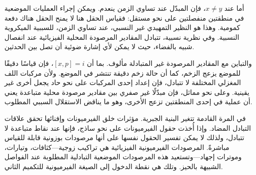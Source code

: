 \begin{classroomqa}
\end{classroomqa}

أما عند \(x\neq y\)، فإن المبدّل عند تساوي الزمن ينعدم. ويمكن إجراء العمليات الموضعية في منطقتين منفصلتين على نحو مستقل: فقياس الحقل هنا لا يمنح الحقل هناك دفعة كمومية. وهذا هو النظير التمهيدي غير النسبي، عند تساوي الزمن، للسببية الميكروية النسبية. وفي نظرية نسبية، تتبادل المقادير المرصودة المحلية الفيزيائية عند انفصال شبيه بالفضاء، حيث لا يمكن لأي إشارة ضوئية أن تصل بين الحدثين.

والتباين مع المقادير المرصودة غير المتبادلة مألوف. بما أن \([x,p]=i\)، فإن قياسًا دقيقًا للموضع يزعج الزخم، كما أن حالة زخم دقيقة تنتشر في الموضع. ولأن مركبات اللف المغزلي المختلفة لا تتبادل، فإن إعداد إحدى المركبات على نحو حاد يجعل أخرى غير يقينية. وعلى نحو مماثل، فإن مبدّلًا غير صفري بين مقادير مرصودة محلية متباعدة يعني أن عملية في إحدى المنطقتين تزعج الأخرى، وهو ما يناقض الاستقلال السببي المطلوب.

\begin{classroomqa}
\end{classroomqa}

في المرة القادمة تتغير البنية الجبرية. مؤثرات خلق الفيرميونات وإفنائها تحقق علاقات التبادل المضاد. وإذا أُخذت حقول الفيرميونات على نحو ساذج، فإنها عند نقاط متباعدة لا تتبادل، ولذلك لا يمكن تفسير الحقول نفسها على أنها مرصودات بوزونية قابلة للقياس مباشرةً. المرصودات الفيرميونية الفيزيائية هي تراكيب زوجية---كثافات، وتيارات، وموترات إجهاد---وتستعيد هذه المرصودات الموضعية التبادلية المطلوبة عند الفواصل الشبيهة بالحيز. وتلك هي نقطة الدخول إلى الصيغة الفيرميونية للتكميم الثاني.
